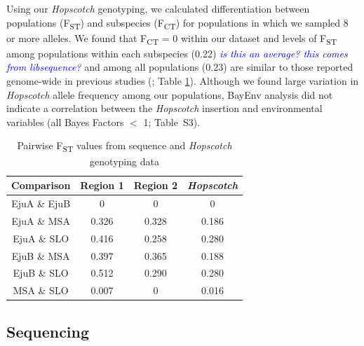 \documentclass[11pt]{article}
\newcommand{\jri}[1]{\textcolor{blue}{ \emph{\scriptsize  #1}} }
\begin{document}
\begin{linenumbers}
\begin{flushleft}
Using our \emph{Hopscotch} genotyping, we calculated differentiation between populations (F\textsubscript{ST}) and subspecies (F\textsubscript{CT}) for populations in which we sampled 8 or more alleles. We found that F\textsubscript{CT} = 0 within our dataset and levels of F\textsubscript{ST} among populations within each subspecies (0.22) \jri{is this an average? this comes from libsequence?} and among all populations (0.23) are similar to those reported genome-wide in previous studies (\citealt{Pyhajarvi2013}; Table \ref{Table1Fst}). Although we found large variation in \emph{Hopscotch} allele frequency among our populations, BayEnv analysis did not indicate a correlation between the \emph{Hopscotch} insertion and environmental variables (all Bayes Factors $<$ 1; Table~S3). 

\begin{table}[htbp]
  \centering
  \caption{Pairwise F\textsubscript{ST} values from sequence and \emph{Hopscotch} genotyping data}
  
    \begin{tabular}{cccc}\\\toprule
    \textbf{Comparison} & \textbf{Region 1} & \textbf{Region 2} & \textbf{\emph{Hopscotch}} \\\midrule
    EjuA \& EjuB & 0     & 0     & 0 \\
    EjuA \& MSA & 0.326 & 0.328 & 0.186 \\
    EjuA \& SLO & 0.416 & 0.258 & 0.280 \\
    EjuB \& MSA & 0.397 & 0.365 & 0.188 \\
    EjuB \& SLO & 0.512  & 0.290 & 0.280 \\
    MSA \& SLO & 0.007  & 0 & 0.016 \\\bottomrule
    \end{tabular}
  \label{Table1Fst}
\end{table}

\subsection*{Sequencing}


\end{flushleft}
\end{linenumbers}
\end{document}
